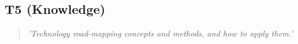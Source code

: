 \subsection{T5 (Knowledge)}

  \begin{quote}
    \textit{'Technology road-mapping concepts and
    methods, and how to apply them.'}
  \end{quote}

\newpage